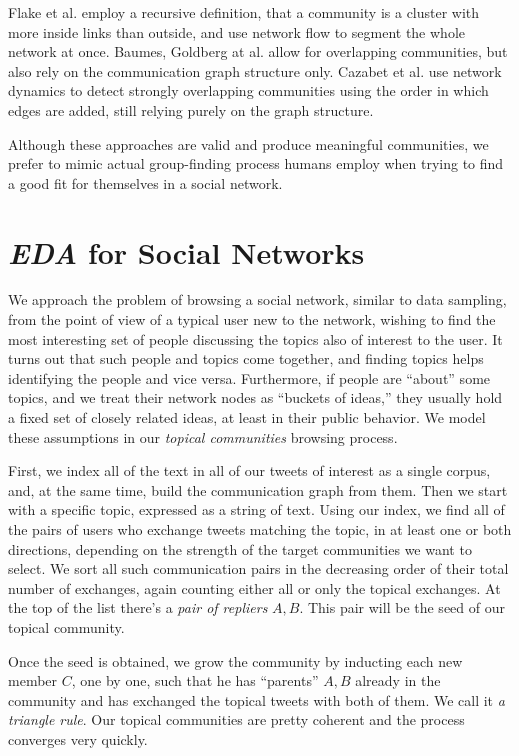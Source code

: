 \documentclass[10pt,oneside]{memoir}
\begin{document}
\begin{Spacing}{2}
Flake et al. \cite{Flake:2002:Communities} employ a recursive definition, that a community is a cluster with more inside links than outside, and use network flow to segment the whole network at once.  Baumes, Goldberg at al. \cite{Baumes:2010:Overlapping, Goldberg:2010:OverlappingClusters} allow for overlapping communities, but also rely on the communication graph structure only.  Cazabet et al. \cite{Cazabet:2010:Communities} use network dynamics to detect strongly overlapping communities using the order in which edges are added, still relying purely on the graph structure.


Although these approaches are valid and produce meaningful communities, we prefer to mimic actual group-finding process humans employ when trying to find a good fit for themselves in a social network.


\pagebreak \section{{\itshape EDA} for Social Networks}
\label{eda_forsocialnetworks}

We approach the problem of browsing a social network, similar to data sampling, from the point of view of a typical user new to the network, wishing to find the most interesting set of people discussing the topics also of interest to the user.  It turns out that such people and topics come together, and finding topics helps identifying the people and vice versa.  Furthermore, if people are ``about'' some topics, and we treat their network nodes as ``buckets of ideas,'' they usually hold a fixed set of closely related ideas, at least in their public behavior.  We model these assumptions in our {\itshape topical communities} browsing process.


First, we index all of the text in all of our tweets of interest as a single corpus, and, at the same time, build the communication graph from them.   Then we start with a specific topic, expressed as a string of text.  Using our index, we find all of the pairs of users who exchange tweets matching the topic, in at least one or both directions, depending on the strength of the target communities we want to select.  We sort all such communication pairs in the decreasing order of their total number of exchanges, again counting either all or only the topical exchanges.  At the top of the list there's a {\itshape pair of repliers} ${A,B}$.  This pair will be the seed of our topical community.  


Once the seed is obtained, we grow the community by inducting each new member $C$, one by one, such that he has ``parents'' ${A,B}$ already in the community and has exchanged the topical tweets with both of them.  We call it {\itshape a triangle rule}.  Our topical communities are pretty coherent and the process converges very quickly.



\end{Spacing}
\end{document}
